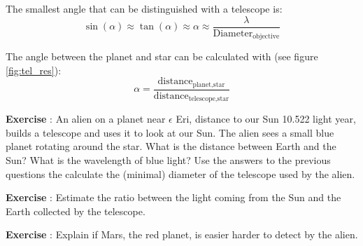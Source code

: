 The smallest angle that can be distinguished with a telescope is:
\begin{equation}
\sin(\alpha) \approx \tan(\alpha) \approx \alpha \approx \frac{\lambda}{\mbox{Diameter}_{\mbox{objective}}}
\end{equation}

The angle between the planet and star can be calculated with (see figure \ref{fig:tel_res}):
\begin{equation}
\alpha = \frac{\mbox{distance}_{\mbox{planet,star}}}{\mbox{distance}_{\mbox{telescope,star}}} 
\end{equation}

\begin{shaded}
\textbf{Exercise \theExercise {}} : An alien on a planet near $\epsilon$ Eri, distance to our Sun 10.522 light year, builds a telescope and uses it to look at our Sun. The alien sees a small blue planet rotating around the star. What is the distance between Earth and the Sun? What is the wavelength of blue light? Use the answers to the previous questions the calculate the (minimal) diameter of the telescope used by the alien.\end{shaded}
\begin{shaded}
\textbf{Exercise \theExercise {}} : Estimate the ratio between the light coming from the Sun and the Earth collected by the telescope.\end{shaded}
\begin{shaded}
\textbf{Exercise \theExercise {}} : Explain if Mars, the red planet, is easier harder to detect by the alien.\end{shaded}



